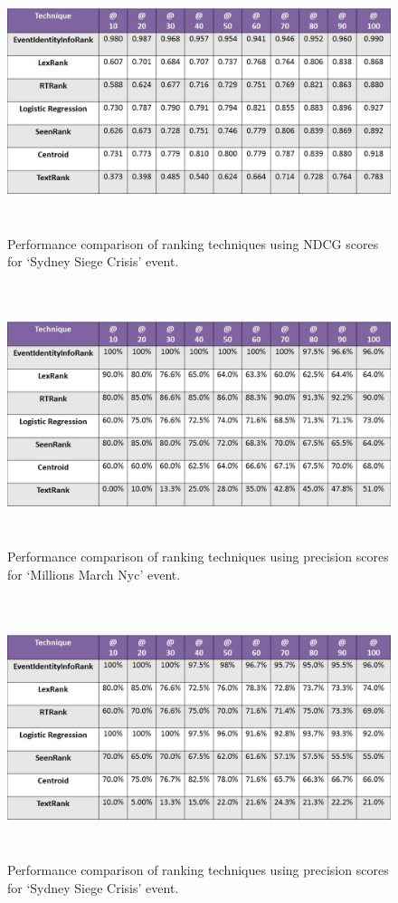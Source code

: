 \begin{figure}[htbp]
\centering
\includegraphics[height=3in,width=5.5in]{Figures/sydneysiegecorrectedndcg.jpg}
\caption{Performance comparison of ranking techniques using NDCG scores for `Sydney Siege Crisis' event.}
\label{sydneysiegendcgtable}
\end{figure}

\begin{figure}[htbp]
\centering
\includegraphics[height=3in,width=5.5in]{Figures/MillionsMarchNycCorrectedPrecision.jpg}
\caption{Performance comparison of ranking techniques using precision scores for `Millions March Nyc' event.}
\label{millionsmarchnycprecisiontable}
\end{figure}

\begin{figure}[htbp]
\centering
\includegraphics[height=3in,width=5.5in]{Figures/sydneysiegeprecisioncorrected.jpg}
\caption{Performance comparison of ranking techniques using precision scores for `Sydney Siege Crisis' event.}
\label{sydneysiegeprecisiontable}
\end{figure}

